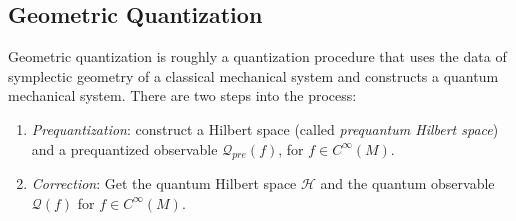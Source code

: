 \documentclass[12pt]{amsart}
\numberwithin{equation}{section}
\theoremstyle{plain}
\theoremstyle{definition}
\theoremstyle{remark}
\newcommand{\calH}{\mathcal{H}}
\begin{document}
\subsection{Geometric Quantization}
Geometric quantization is roughly a quantization procedure that uses the data of symplectic geometry of a classical mechanical system and constructs a quantum mechanical system. There are two steps into the process: 
\begin{enumerate}[(Step1)]
\item{\emph{Prequantization}: construct a Hilbert space (called \emph{prequantum Hilbert space}) and a prequantized observable $\mathscr{Q}_{pre}(f)$, for $f\in C^\infty(M)$.
}
\item{\emph{Correction}: Get the quantum Hilbert space $\calH$ and the quantum observable $\mathscr{Q}(f)$ for $f\in C^\infty(M)$.
}
\end{enumerate}
\end{document}

